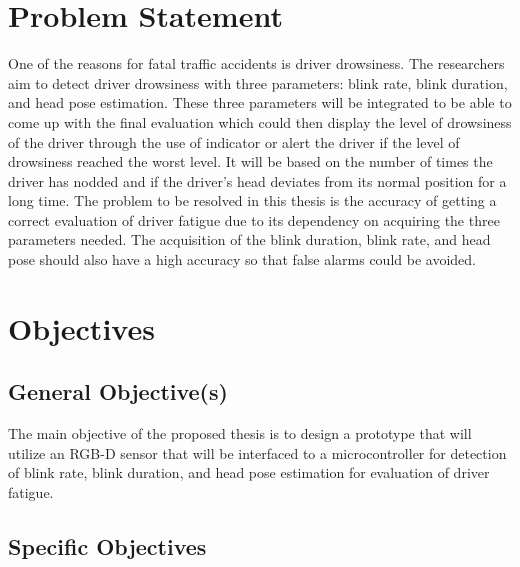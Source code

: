 \section{Problem Statement}


One of the reasons for fatal traffic accidents is driver drowsiness. The researchers aim to detect driver drowsiness with three parameters: blink rate, blink duration, and head pose estimation. These three parameters will be integrated to be able to come up with the final evaluation which could then display the level of drowsiness of the driver through the use of indicator or alert the driver if the level of drowsiness reached the worst level. It will be based on the number of times the driver has nodded and if the driver’s head deviates from its normal position for a long time. The problem to be resolved in this thesis is the accuracy of getting a correct evaluation of driver fatigue due to its dependency on acquiring the three parameters needed. The acquisition of the blink duration, blink rate, and head pose should also have a high accuracy so that false alarms could be avoided. 



\section{Objectives}


\subsection{General Objective(s)}
The main objective of the proposed thesis is to design a prototype that will utilize an RGB-D sensor that will be interfaced to a microcontroller for detection of blink rate, blink duration, and head pose estimation for evaluation of driver fatigue.

\subsection{Specific Objectives}

